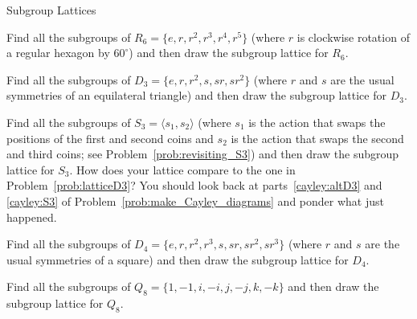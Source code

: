 \begin{section}{Subgroup Lattices}
\begin{problem}
Find all the subgroups of $R_6=\{e,r,r^2,r^3,r^4,r^5\}$ (where $r$ is clockwise rotation of a regular hexagon by $60^{\circ}$) and then draw the subgroup lattice for $R_6$.
\end{problem}

\begin{problem}\label{prob:latticeD3}
Find all the subgroups of $D_3=\{e,r,r^2,s,sr,sr^2\}$ (where $r$ and $s$ are the usual symmetries of an equilateral triangle) and then draw the subgroup lattice for $D_3$.
\end{problem}

\begin{problem}
Find all the subgroups of $S_3=\langle s_1, s_2\rangle$ (where $s_1$ is the action that swaps the positions of the first and second coins and $s_2$ is the action that swaps the second and third coins; see Problem~\ref{prob:revisiting_S3}) and then draw the subgroup lattice for $S_3$. How does your lattice compare to the one in Problem~\ref{prob:latticeD3}? You should look back at parts~\ref{cayley:altD3} and \ref{cayley:S3} of Problem~\ref{prob:make_Cayley_diagrams} and ponder what just happened.
\end{problem}

\begin{problem}
Find all the subgroups of $D_4=\{e,r,r^2,r^3,s,sr,sr^2,sr^3\}$ (where $r$ and $s$ are the usual symmetries of a square) and then draw the subgroup lattice for $D_4$.
\end{problem}

\begin{problem}
Find all the subgroups of $Q_8=\{1,-1,i,-i,j,-j,k,-k\}$ and then draw the subgroup lattice for $Q_8$.
\end{problem}

\end{section}


